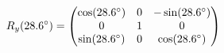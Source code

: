 \documentclass[preview]{standalone}
\begin{document}
\begin{align*}
\special{dvisvgm:raw <g id='unique000'>}R_y(28.6^\circ) = \begin{pmatrix} \cos(28.6^\circ) & 0 & -\sin(28.6^\circ) \\ 0 & 1 & 0 \\ \sin(28.6^\circ) & 0 & \cos(28.6^\circ) \end{pmatrix}\special{dvisvgm:raw </g>}
\end{align*}
\end{document}
